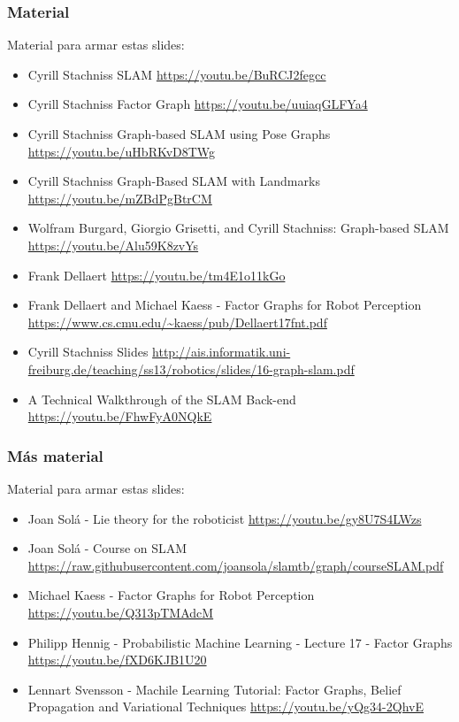 \begin{frame}
    \frametitle{Material}
    
    Material para armar estas slides:
    \begin{itemize}
        \item Cyrill Stachniss SLAM \url{https://youtu.be/BuRCJ2fegcc}
           \item Cyrill Stachniss Factor Graph \url{https://youtu.be/uuiaqGLFYa4}
        \item Cyrill Stachniss Graph-based SLAM using Pose Graphs \url{https://youtu.be/uHbRKvD8TWg}
        \item Cyrill Stachniss Graph-Based SLAM with Landmarks \url{https://youtu.be/mZBdPgBtrCM}
        \item Wolfram Burgard, Giorgio Grisetti, and Cyrill Stachniss: Graph-based SLAM \url{https://youtu.be/Alu59K8zvYs}
        \item Frank Dellaert \url{https://youtu.be/tm4E1o11kGo}
        \item Frank Dellaert and Michael Kaess - Factor Graphs for Robot Perception \url{https://www.cs.cmu.edu/~kaess/pub/Dellaert17fnt.pdf}
        \item Cyrill Stachniss Slides \url{http://ais.informatik.uni-freiburg.de/teaching/ss13/robotics/slides/16-graph-slam.pdf}
        \item A Technical Walkthrough of the SLAM Back-end \url{https://youtu.be/FhwFyA0NQkE}
    \end{itemize}
    
\end{frame}

\begin{frame}
    \frametitle{Más material}
    
    Material para armar estas slides:
    \begin{itemize}
        \item Joan Solá - Lie theory for the roboticist \url{https://youtu.be/gy8U7S4LWzs}
        \item Joan Solá - Course on SLAM \url{https://raw.githubusercontent.com/joansola/slamtb/graph/courseSLAM.pdf}
        \item Michael Kaess - Factor Graphs for Robot Perception \url{https://youtu.be/Q313pTMAdcM}
        \item Philipp Hennig - Probabilistic Machine Learning - Lecture 17 - Factor Graphs \url{https://youtu.be/fXD6KJB1U20}
        \item Lennart Svensson - Machile Learning Tutorial: Factor Graphs, Belief Propagation and Variational Techniques \url{https://youtu.be/yQg34-2QhvE}
    \end{itemize}
    
\end{frame}



